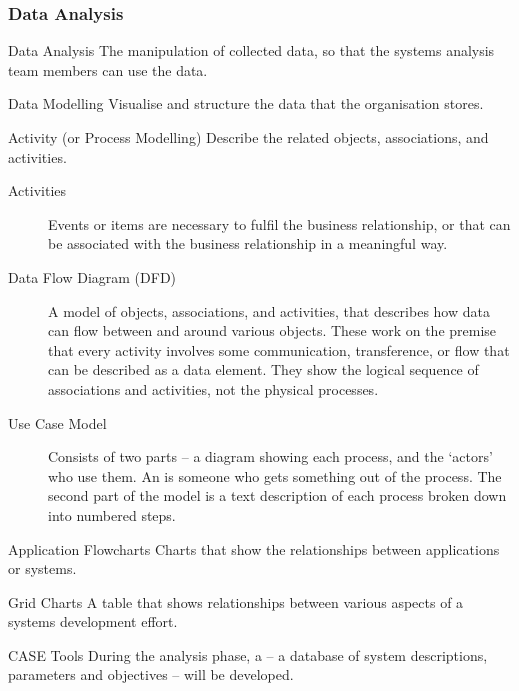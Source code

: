 \documentclass[\main/notes.tex]{subfiles}
\begin{document}
				\subsubsection{Data Analysis}
					\begin{definition}{Data Analysis}
						The manipulation of collected data, so that the systems analysis team members can use the data.
					\end{definition}
					\begin{definition}{Data Modelling}
							Visualise and structure the data that the organisation stores.
					\end{definition}
					\begin{definition}{Activity (or Process Modelling)}
						Describe the related objects, associations, and activities.
						\begin{description}
							\item[Activities] Events or items are necessary to fulfil the business relationship, or that can be associated with the business relationship in a meaningful way.
							\item[Data Flow Diagram (DFD)] A model of objects, associations, and activities, that describes how data can flow between and around various objects. These work on the premise that every activity involves some communication, transference, or flow that can be described as a data element. They show the logical sequence of associations and activities, not the physical processes.
							\item[Use Case Model] Consists of two parts -- a diagram showing each process, and the `actors' who use them. An  is someone who gets something out of the process. The second part of the model is a text description of each process broken down into numbered steps.
						\end{description}
					\end{definition}
					\begin{definition}{Application Flowcharts}
						Charts that show the relationships between applications or systems.
					\end{definition}
					\begin{definition}{Grid Charts}
						A table that shows relationships between various aspects of a systems development effort.
					\end{definition}
					\begin{definition}{CASE Tools}
						During the analysis phase, a  -- a database of system descriptions, parameters and objectives -- will be developed.
					\end{definition}
\end{document}
